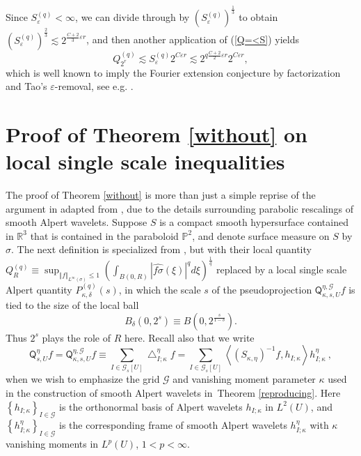 \documentclass{amsart}%
\theoremstyle{plain}
\numberwithin{equation}{section}
\begin{document}
Since $S_{\varepsilon}^{\left(  q\right)  }<\infty$, we can divide through by
$\left(  S_{\varepsilon}^{\left(  q\right)  }\right)  ^{\frac{1}{3}}$ to
obtain $\left(  S_{\varepsilon}^{\left(  q\right)  }\right)  ^{\frac{2}{3}%
}\lesssim2^{\frac{C+2}{3}\varepsilon r}$, and then another application of
(\ref{Q=<S}) yields%
\[
Q_{2^{r}}^{\left(  q\right)  }\lesssim S_{\varepsilon}^{\left(  q\right)
}2^{C\varepsilon r}\lesssim2^{q\frac{C+2}{2}\varepsilon r}2^{C\varepsilon r},
\]
which is well known to imply the Fourier extension conjecture by factorization
and Tao's $\varepsilon$-removal, see e.g. \cite{BoGu}.

\section{Proof of Theorem \ref{without} on local single scale inequalities}

The proof of Theorem \ref{without} is more than just a simple reprise of the
argument in \cite{RiSa} adapted from \cite{BoGu}, due to the details
surrounding parabolic rescalings of smooth Alpert wavelets. Suppose $S$ is a
compact smooth hypersurface contained in $\mathbb{R}^{3}$ that is contained in
the paraboloid $\mathbb{P}^{2}$, and denote surface measure on $S$ by $\sigma
$. The next definition is specialized from \cite{BoGu}, but with their local
quantity $Q_{R}^{\left(  q\right)  }\equiv\sup_{\left\Vert f\right\Vert
_{L^{\infty}\left(  \sigma\right)  }\leq1}\left(  \int_{B\left(  0,R\right)
}\left\vert \widehat{f\sigma}\left(  \xi\right)  \right\vert ^{q}d\xi\right)
^{\frac{1}{q}}$ replaced by a local single scale Alpert quantity
$P_{\kappa,\delta}^{\left(  q\right)  }\left(  s\right)  $, in which the scale
$s$ of the pseudoprojection $\mathsf{Q}_{\kappa,s,U}^{\eta,\mathcal{G}}f$ is
tied to the size of the local ball%
\[
B_{\delta}\left(  0,2^{s}\right)  \equiv B\left(  0,2^{\frac{s}{1-\delta}%
}\right)  .
\]
Thus $2^{s}$ plays the role of $R$ here. Recall also that we write
\[
\mathsf{Q}_{s,U}^{\eta}f=\mathsf{Q}_{\kappa,s,U}^{\eta,\mathcal{G}}f\equiv
\sum_{I\in\mathcal{G}_{s}\left[  U\right]  }\bigtriangleup_{I;\kappa}^{\eta
}f=\sum_{I\in\mathcal{G}_{s}\left[  U\right]  }\left\langle \left(
S_{\kappa,\eta}\right)  ^{-1}f,h_{I;\kappa}\right\rangle h_{I;\kappa}^{\eta
}\ ,
\]
when we wish to emphasize the grid $\mathcal{G}$ and vanishing moment
parameter $\kappa$ used in the construction of smooth Alpert wavelets
in\ Theorem \ref{reproducing}. Here $\left\{  h_{I;\kappa}\right\}
_{I\in\mathcal{G}}$ is the orthonormal basis of Alpert wavelets $h_{I;\kappa}$
in $L^{2}\left(  U\right)  $, and $\left\{  h_{I;\kappa}^{\eta}\right\}
_{I\in\mathcal{G}}$ is the corresponding frame of smooth Alpert wavelets
$h_{I;\kappa}^{\eta}$ with $\kappa$ vanishing moments in $L^{p}\left(
U\right)  $, $1<p<\infty$.
\end{document}
